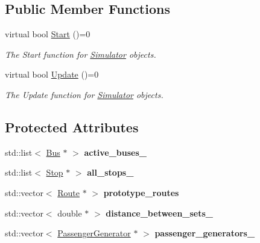 \subsection*{Public Member Functions}
\begin{DoxyCompactItemize}
\item 
virtual bool \hyperlink{classSimulator_a0db68bef442ba6061a5f38189bbe3512}{Start} ()=0
\begin{DoxyCompactList}\small\item\em The Start function for \hyperlink{classSimulator}{Simulator} objects. \end{DoxyCompactList}\item 
virtual bool \hyperlink{classSimulator_a7a5a1cbfa1e0cf9b82fe9d2e4b3b80ae}{Update} ()=0
\begin{DoxyCompactList}\small\item\em The Update function for \hyperlink{classSimulator}{Simulator} objects. \end{DoxyCompactList}\end{DoxyCompactItemize}
\subsection*{Protected Attributes}
\begin{DoxyCompactItemize}
\item 
\mbox{\label{classSimulator_a2936ff199db47fac93a4ca2970a8bf9a}} 
std\+::list$<$ \hyperlink{classBus}{Bus} $\ast$ $>$ {\bfseries active\+\_\+buses\+\_\+}
\item 
\mbox{\label{classSimulator_aa5539319a6b4a70c2d0c6f6220fe44c7}} 
std\+::list$<$ \hyperlink{classStop}{Stop} $\ast$ $>$ {\bfseries all\+\_\+stops\+\_\+}
\item 
\mbox{\label{classSimulator_a5be4c046d8654aa28b37308f581c3fc9}} 
std\+::vector$<$ \hyperlink{classRoute}{Route} $\ast$ $>$ {\bfseries prototype\+\_\+routes}
\item 
\mbox{\label{classSimulator_aa14b28ce4f5c0fa6f9e96f9e3b9aae73}} 
std\+::vector$<$ double $\ast$ $>$ {\bfseries distance\+\_\+between\+\_\+sets\+\_\+}
\item 
\mbox{\label{classSimulator_a666884fa56160538fb7ceac476aedd44}} 
std\+::vector$<$ \hyperlink{classPassengerGenerator}{Passenger\+Generator} $\ast$ $>$ {\bfseries passenger\+\_\+generators\+\_\+}
\end{DoxyCompactItemize}


